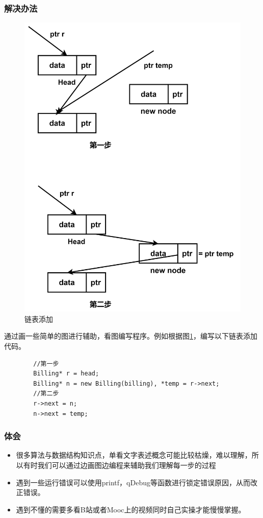 \documentclass{article}
\begin{document}
    \subsubsection{解决办法}
    \begin{figure}[h]
        \centering
        \includegraphics[scale=0.1]{figure/linklist_add.png}
        \caption{链表添加}
        \label{linklist_add}
    \end{figure}
    通过画一些简单的图进行辅助，看图编写程序。例如根据图\ref{linklist_add}，编写以下链表添加代码。
    \begin{verbatim}
        //第一步
        Billing* r = head;
        Billing* n = new Billing(billing), *temp = r->next;
        //第二步
        r->next = n;
        n->next = temp;
    \end{verbatim}
    \subsubsection{体会}
    \begin{itemize}
        \item 很多算法与数据结构知识点，单看文字表述概念可能比较枯燥，难以理解，所以有时我们可以通过边画图边编程来辅助我们理解每一步的过程
        \item 遇到一些运行错误可以使用printf，qDebug等函数进行锁定错误原因，从而改正错误。
        \item 遇到不懂的需要多看B站或者Mooc上的视频同时自己实操才能慢慢掌握。
    \end{itemize}
\end{document}
